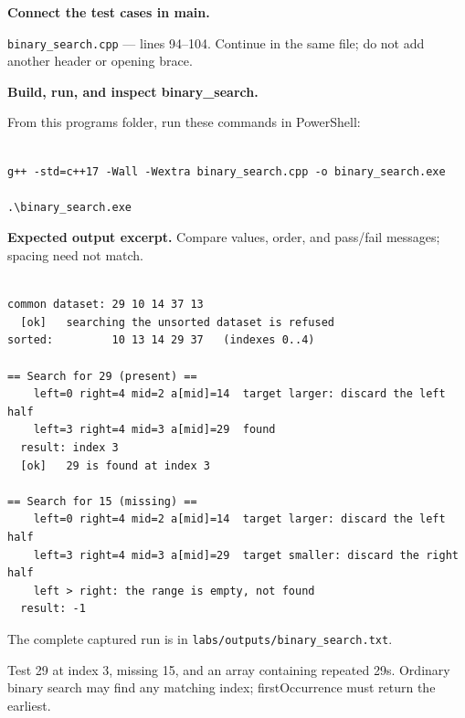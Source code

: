 \tcbbreak

\begin{utpsteps}\setcounter{enumi}{3}\item \textbf{Connect the test cases in main.}\end{utpsteps}

\texttt{binary\_search.cpp} --- lines 94--104. Continue in the same file; do not add another header or opening brace.




\tcbbreak

\textbf{Build, run, and inspect binary\_search.}

From this program\textquotesingle s folder, run these commands in PowerShell:

\begin{lstlisting}[style=utpterminal,language={}]

g++ -std=c++17 -Wall -Wextra binary_search.cpp -o binary_search.exe

.\binary_search.exe

\end{lstlisting}

\textbf{Expected output excerpt.} Compare values, order, and pass/fail messages; spacing need not match.

\begin{lstlisting}[style=utpterminal,language={}]

common dataset: 29 10 14 37 13
  [ok]   searching the unsorted dataset is refused
sorted:         10 13 14 29 37   (indexes 0..4)

== Search for 29 (present) ==
    left=0 right=4 mid=2 a[mid]=14  target larger: discard the left half
    left=3 right=4 mid=3 a[mid]=29  found
  result: index 3
  [ok]   29 is found at index 3

== Search for 15 (missing) ==
    left=0 right=4 mid=2 a[mid]=14  target larger: discard the left half
    left=3 right=4 mid=3 a[mid]=29  target smaller: discard the right half
    left > right: the range is empty, not found
  result: -1

\end{lstlisting}

The complete captured run is in \texttt{labs/outputs/binary\_search.txt}.

\begin{tryit}

Test 29 at index 3, missing 15, and an array containing repeated 29s. Ordinary binary search may find any matching index; firstOccurrence must return the earliest.

\end{tryit}

